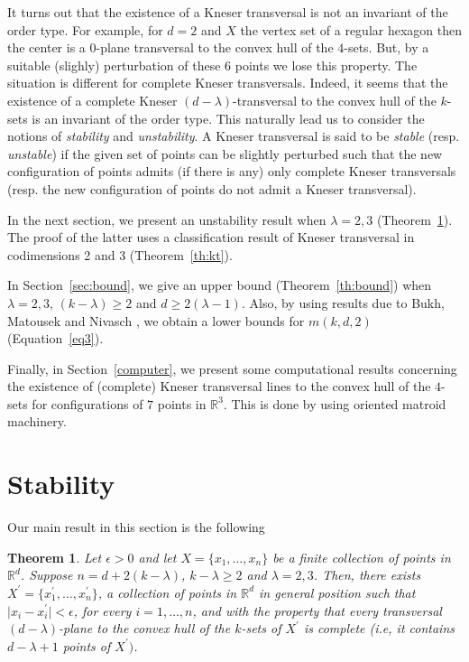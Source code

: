 \documentclass[11pt]{amsart}
\theoremstyle{plain}
\newtheorem{theorem}{Theorem}[section]
\theoremstyle{definition}
\theoremstyle{remark}
\begin{document}
It turns out that the existence of a Kneser transversal is not an invariant of the order type. For example, for $d=2$ and $X$ the vertex set of a regular hexagon then the center is a $0$-plane transversal to the convex hull of the $4$-sets. But, by a suitable (slighly) perturbation of these $6$ points we lose this property. The situation is different for complete Kneser transversals. Indeed, it seems that the existence of a complete Kneser $(d-\lambda)$-transversal to the convex hull of the $k$-sets is an invariant of the order type. This naturally lead us to consider the notions of {\em stability} and {\em unstability}. A Kneser transversal is said to be {\em stable} (resp. {\em unstable}) if the given set of points can be slightly perturbed such that the new configuration of points admits (if there is any) only complete Kneser transversals (resp. the new configuration of points do not admit a Kneser transversal). 
\medskip

In the next section, we present an unstability result when $\lambda =2,3$ (Theorem~\ref{stability}). The proof of the latter uses a classification result of Kneser transversal in codimensions 2 and 3  (Theorem~\ref{th:kt}). 
\medskip

In Section~\ref{sec:bound}, we give an upper bound (Theorem~\ref{th:bound}) when $\lambda=2,3$, $(k-\lambda){\geqslant} 2$ and $d{\geqslant} 2(\lambda-1)$. Also, by using results due to Bukh, Matousek and Nivasch \cite{BMN}, we obtain a lower bounds for $m(k,d,2)$ (Equation~\eqref{eq3}).
\medskip

Finally, in Section~\ref{computer}, we present some computational results concerning  the existence of (complete) Kneser transversal lines to the convex hull of the $4$-sets for configurations of $7$ points in $\mathbb{R}^{3}$. This is done by using oriented matroid machinery.

\section{Stability}

Our main result in this section is the following

\begin{theorem}\label{stability}
Let $\epsilon >0$ and let $X=\{x_1,\dots ,x_n\}$ be a finite collection of points in ${\mathbb{R}}^{d}$. Suppose $n=d + 2(k-\lambda)$, $k-\lambda {\geqslant} 2$ and $\lambda=2,3$. Then, there exists $X^\prime=\{x^\prime_1,\dots ,x^\prime_n\}$, a collection of points in ${\mathbb{R}}^{d}$  in general position such that $\mid x_i - x^\prime _i \mid < \epsilon$, for every $i=1,\dots ,n$, and with the property that every transversal $(d-\lambda)$-plane to the convex hull of the $k$-sets of $X^\prime$ is complete (i.e,  it contains  $d-\lambda +1$ points of $X^\prime)$.
\end{theorem}
\end{document}
